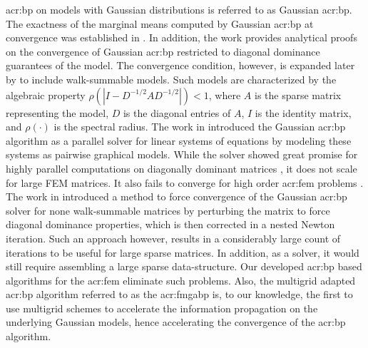 \gls{acr:bp} on models with Gaussian distributions is referred to as Gaussian \gls{acr:bp}.
The exactness of the marginal means computed by Gaussian \gls{acr:bp} at convergence was established in \cite{bib:Weiss01CorrectnessBelief}.
In addition, the work provides analytical proofs on the convergence of Gaussian \gls{acr:bp} restricted to diagonal dominance guarantees of the model.
The convergence condition, however, is expanded later by \cite{bib:Johnson2006WIAGBP,bib:malioutov2006walk} to include walk-summable models.
Such models are characterized by the algebraic property $\rho\left( \left| I - D^{-1/2}AD^{-1/2} \right|\right) < 1$, where $A$ is the sparse matrix representing the model, $D$ is the diagonal entries of $A$, $I$ is the identity matrix, and $\rho(\cdot)$ is the spectral radius.
The work in \cite{bib:Shental2008GBPSSLE} introduced the Gaussian \gls{acr:bp} algorithm as a parallel solver for linear systems of equations by modeling these systems as pairwise graphical models.
While the solver showed great promise for highly parallel computations on diagonally dominant matrices \cite{bib:El-Kurdi2012EIOGBPSFLSDDLS}, it does not scale for large FEM matrices.
It also fails to converge for high order \gls{acr:fem} problems \cite{bib:El-Kurdi2012FEM-GaBP,bib:El-Kurdi2012RGBP}.
The work in \cite{bib:Dolev09FC} introduced a method to force convergence of the Gaussian \gls{acr:bp} solver for none walk-summable matrices by perturbing the matrix to force diagonal dominance properties, which is then corrected in a nested Newton iteration.
Such an approach however, results in a considerably large count of iterations to be useful for large sparse matrices.
In addition, as a solver, it would still require assembling a large sparse data-structure.
Our developed \gls{acr:bp} based algorithms for the \gls{acr:fem} eliminate such problems. 
Also, the multigrid adapted \gls{acr:bp} algorithm referred to as the \gls{acr:fmgabp} is, to our knowledge, the first to use multigrid schemes to accelerate the information propagation on the underlying Gaussian models, hence accelerating the convergence of the \gls{acr:bp} algorithm.


